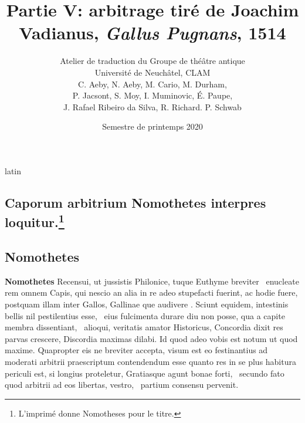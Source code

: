 \documentclass[12pt]{book}
\renewenvironment{latin}
    	{\begin{hyphenrules}{latin}}
    	{\end{hyphenrules}}
\begin{document}
        \title{Partie V: arbitrage tiré de Joachim Vadianus, \textit{Gallus Pugnans}, 1514}
        \author{Atelier de traduction du Groupe de théâtre antique\\
            Université de Neuchâtel, CLAM\\
            C. Aeby, N. Aeby, M. Cario, M. Durham,\\ 
            P. Jacsont, S. Moy, I. Muminovic, É. Paupe,\\
            J. Rafael Ribeiro da Silva, R. Richard. P. Schwab}
        \date{Semestre de printemps 2020}
        
        \maketitle
        \begin{pages}
        \begin{latin}
        \begin{Leftside}
        \beginnumbering 
            \pstart\section*{Caporum arbitrium Nomothetes interpres loquitur.\footnote{L'imprimé donne Nomotheses pour le titre.}}\pend\pstart\subsection*{Nomothetes}\pend\pstart\textbf{Nomothetes}\hspace{1cm} 
                    Recensui, ut jussistis Philonice, tuque Euthyme breviter ﻿\ampersand\ enucleate rem omnem Capis, 
                    qui nescio an alia in re  adeo stupefacti fuerint, 
                    ac hodie fuere, postquam illam inter Gallos, Gallinae que audivere . 
                    Sciunt equidem, intestinis bellis nil pestilentius esse, ﻿\ampersand\ eius  fulcimenta durare diu non posse, 
                    qua a capite membra dissentiant, ﻿\ampersand\ alioqui, veritatis amator Historicus, Concordia dixit res parvas crescere, Discordia maximas dilabi. 
                    Id quod adeo vobis est notum ut quod maxime. 
                    Quapropter eis ne breviter accepta, 
                    visum est eo festinantius ad moderati arbitrii praescriptum contendendum esse quanto res in se plus habitura periculi est, 
                    si longius proteletur, Gratiasque agunt bonae forti, ﻿\ampersand\ secundo fato quod arbitrii ad eos libertas, vestro, ﻿\ampersand\ partium consensu pervenit. 

\end{Leftside}
\end{latin}
\end{pages}
\end{document}
